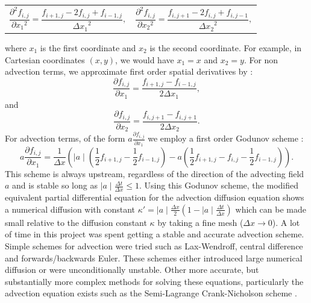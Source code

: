 \documentclass{article}
\begin{document}
\begin{tabularx}{\textwidth}{XX}
\begin{equation}
	\frac{\partial^2 f_{i,j}}{\partial {x_1}^2} = \frac{f_{i+1,j} - 2 f_{i,j} + f_{i-1,j}}{{\Delta x_1}^2},
\end{equation}
    &
\begin{equation}
	\frac{\partial^2 f_{i,j}}{\partial {x_2}^2} = \frac{f_{i,j+1} - 2 f_{i,j} + f_{i,j-1}}{{\Delta x_2}^2},
\end{equation}
\end{tabularx}
where $x_1$ is the first coordinate and $x_2$ is the second coordinate. For example, in Cartesian coordinates $(x,y)$, we would have $x_1=x$ and $x_2=y$. 
For non advection terms, we approximate first order spatial derivatives by \cite{press1986numerical}:
\begin{equation}
	\frac{\partial f_{i,j}}{\partial x_1} = \frac{f_{i+1,j} - f_{i-1,j}}{2{\Delta x_1}},
\end{equation}
and
\begin{equation}
	\frac{\partial f_{i,j}}{\partial x_2} = \frac{f_{i,j+1} - f_{i,j+1}}{2{\Delta x_2}}.
\end{equation}
For advection terms, of the form $a \frac{\partial f_{i,j}}{\partial x_1}$ we employ a first order Godunov scheme \cite{godunov1959difference, guinot2003godunov}:
\begin{equation}
	a \frac{\partial f_{i,j}}{\partial x_1} = \frac{1}{\Delta x} ( \mid a\mid (  \frac{1}{2} f_{i+1,j} - \frac{1}{2} f_{i-1,j}   ) - a ( \frac{1}{2} f_{i+1,j} -f_{i,j} - \frac{1}{2} f_{i-1,j} )).
\end{equation}
This scheme is always upstream, regardless of the direction of the advecting field $a$ and is stable so long as $\mid a \mid \frac{\Delta t}{\Delta x} \leq 1$. Using this Godunov scheme, the modified equivalent partial differential equation for the advection diffusion equation shows a numerical diffusion with constant $\kappa' = \mid a \mid \frac{\Delta x}{2} (1 - \mid a \mid \frac{\Delta t}{\Delta x})$ which can be made small relative to the diffusion constant $\kappa$ by taking a fine mesh ($\Delta x \rightarrow 0$). 
\newline
A lot of time in this project was spent getting a stable and accurate advection scheme. Simple schemes for advection were tried such as Lax-Wendroff, central difference and forwards/backwards Euler. These schemes either introduced large numerical diffusion or were unconditionally unstable. Other more accurate, but substantially more complex methods for solving these equations, particularly the advection equation exists such as the Semi-Lagrange Crank-Nicholson scheme \cite{spiegelman2006semi}.
\end{document}
